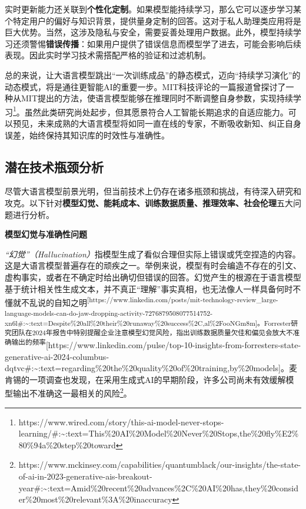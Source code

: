 \documentclass[
  letterpaper,
]{scrbook}
\begin{document}
实时更新能力还关联到\textbf{个性化定制}。如果模型能持续学习，那么它可以逐步学习某个特定用户的偏好与知识背景，提供量身定制的回答。这对于私人助理类应用将是巨大优势。当然，这涉及隐私与安全，需要妥善处理用户数据。此外，模型持续学习还须警惕\textbf{错误传播}：如果用户提供了错误信息而模型学了进去，可能会影响后续表现。因此实时学习技术需搭配严格的验证和过滤机制。

总的来说，让大语言模型跳出``一次训练成品''的静态模式，迈向``持续学习演化''的动态模式，将是通往更智能AI的重要一步。MIT科技评论的一篇报道曾探讨了一种从MIT提出的方法，使语言模型能够在推理同时不断调整自身参数，实现持续学习\footnote{https://www.wired.com/story/this-ai-model-never-stops-learning/\#:\textasciitilde:text=This\%20AI\%20Model\%20Never\%20Stops,the\%20fly\%E2\%80\%94a\%20step\%20toward}。虽然此类研究尚处起步，但其愿景符合人工智能长期追求的自适应能力。可以预见，未来成熟的大语言模型将如同一直在线的专家，不断吸收新知、纠正自身误差，始终保持其知识库的时效性与准确性。

\subsection{潜在技术瓶颈分析}\label{ux6f5cux5728ux6280ux672fux74f6ux9888ux5206ux6790}

尽管大语言模型前景光明，但当前技术上仍存在诸多瓶颈和挑战，有待深入研究和攻克。以下针对\textbf{模型幻觉、能耗成本、训练数据质量、推理效率、社会伦理}五大问题进行分析。

\textbf{模型幻觉与准确性问题}

\emph{``幻觉''（Hallucination）}指模型生成了看似合理但实际上错误或凭空捏造的内容。这是大语言模型普遍存在的顽疾之一。举例来说，模型有时会编造不存在的引文、虚构事实，或者在不确定时给出确切但错误的回答。幻觉产生的根源在于语言模型基于统计相关性生成文本，并不真正``理解''事实真相，也无法像人一样具备何时不懂就不乱说的自知之明\textsuperscript{{[}https://www.linkedin.com/posts/mit-technology-review\_large-language-models-can-do-jaw-dropping-activity-7276879508077514752-xn6l\#:\textasciitilde:text=Despite\%20all\%20their\%20runaway\%20success\%2C,al\%2FooNGm8m{]}。Forrester研究团队在2024年报告中特别提醒企业注意模型幻觉风险，指出训练数据质量欠佳和偏见会放大不准确输出的频率}{[}https://www.linkedin.com/pulse/top-10-insights-from-forresters-state-generative-ai-2024-columbus-dqtvc\#:\textasciitilde:text=regarding\%20the\%20quality\%20of\%20training,by\%20models{]}。麦肯锡的一项调查也发现，在采用生成式AI的早期阶段，许多公司尚未有效缓解模型输出不准确这一最相关的风险\footnote{https://www.mckinsey.com/capabilities/quantumblack/our-insights/the-state-of-ai-in-2023-generative-ais-breakout-year\#:\textasciitilde:text=Amid\%20recent\%20advances\%2C\%20AI\%20has,they\%20consider\%20most\%20relevant\%3A\%20inaccuracy}。
\end{document}
